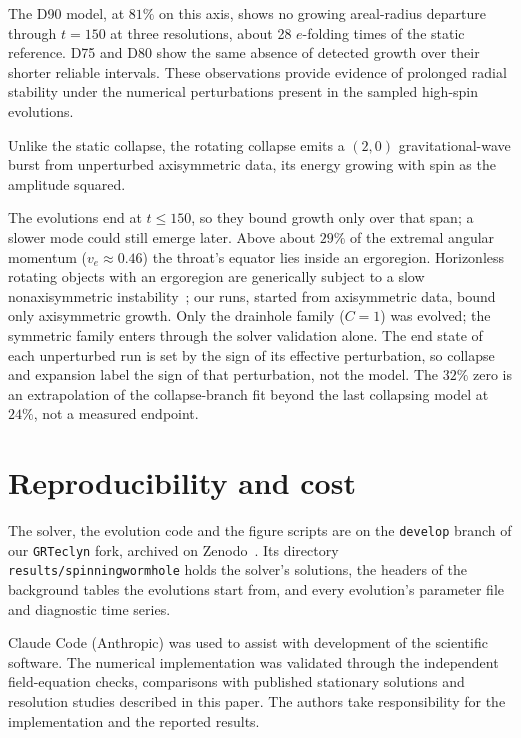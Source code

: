 \documentclass[twocolumn,floatfix,aps,prd,superscriptaddress,nofootinbib]{revtex4-2}
\begin{document}
The D90 model, at $81\%$ on this axis, shows no growing areal-radius departure through $t=150$ at three resolutions, about 28 $e$-folding times of the static reference. D75 and D80 show the same absence of detected growth over their shorter reliable intervals. These observations provide evidence of prolonged radial stability under the numerical perturbations present in the sampled high-spin evolutions.

Unlike the static collapse, the rotating collapse emits a $(2,0)$ gravitational-wave burst from unperturbed axisymmetric data, its energy growing with spin as the amplitude squared.

The evolutions end at $t\le150$, so they bound growth only over that span; a slower mode could still emerge later. Above about $29\%$ of the extremal angular momentum ($v_e\approx0.46$) the throat's equator lies inside an ergoregion. Horizonless rotating objects with an ergoregion are generically subject to a slow nonaxisymmetric instability~\cite{friedman1978,cardoso2008}; our runs, started from axisymmetric data, bound only axisymmetric growth. Only the drainhole family ($C=1$) was evolved; the symmetric family enters through the solver validation alone. The end state of each unperturbed run is set by the sign of its effective perturbation, so collapse and expansion label the sign of that perturbation, not the model. The $32\%$ zero is an extrapolation of the collapse-branch fit beyond the last collapsing model at $24\%$, not a measured endpoint.

\section{Reproducibility and cost}
\label{sec:data}

The solver, the evolution code and the figure scripts are on the \texttt{develop} branch of our \texttt{GRTeclyn} fork, archived on Zenodo~\cite{shirokov2026code}. Its directory \texttt{results/spinningwormhole} holds the solver's solutions, the headers of the background tables the evolutions start from, and every evolution's parameter file and diagnostic time series.

Claude Code (Anthropic) was used to assist with development of the scientific software. The numerical implementation was validated through the independent field-equation checks, comparisons with published stationary solutions and resolution studies described in this paper. The authors take responsibility for the implementation and the reported results.
\end{document}
